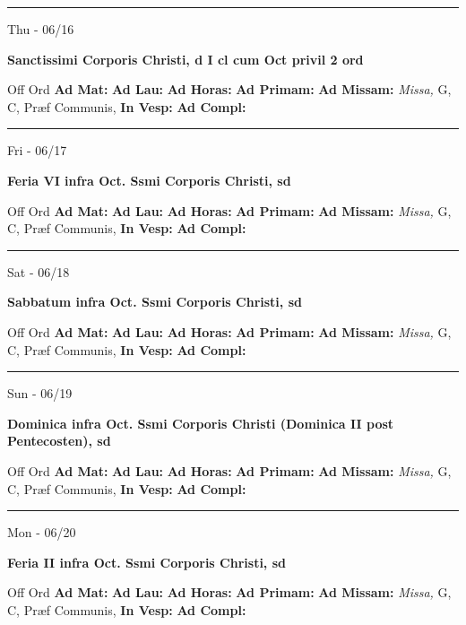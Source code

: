 \documentclass[letterpaper, 10pt]{article}
\begin{document}
\hrule
\begin{center}
Thu - 06/16
\end{center}\textbf{ \large Sanctissimi Corporis Christi, \textnormal{\normalsize d I cl cum Oct privil 2 ord}}
\begin{justify}
Off Ord
\textbf{Ad Mat: }
\textbf{Ad Lau: }
\textbf{Ad Horas: }
\textbf{Ad Primam: }
\textbf{Ad Missam:} \textit{Missa, } G, C, Præf Communis, 
\textbf{In Vesp: }
\textbf{Ad Compl: }\end{justify}



\hrule
\begin{center}
Fri - 06/17
\end{center}\textbf{ \large Feria VI infra Oct. Ssmi Corporis Christi, \textnormal{\normalsize sd}}
\begin{justify}
Off Ord
\textbf{Ad Mat: }
\textbf{Ad Lau: }
\textbf{Ad Horas: }
\textbf{Ad Primam: }
\textbf{Ad Missam:} \textit{Missa, } G, C, Præf Communis, 
\textbf{In Vesp: }
\textbf{Ad Compl: }\end{justify}



\hrule
\begin{center}
Sat - 06/18
\end{center}\textbf{ \large Sabbatum infra Oct. Ssmi Corporis Christi, \textnormal{\normalsize sd}}
\begin{justify}
Off Ord
\textbf{Ad Mat: }
\textbf{Ad Lau: }
\textbf{Ad Horas: }
\textbf{Ad Primam: }
\textbf{Ad Missam:} \textit{Missa, } G, C, Præf Communis, 
\textbf{In Vesp: }
\textbf{Ad Compl: }\end{justify}



\hrule
\begin{center}
Sun - 06/19
\end{center}\textbf{ \large Dominica infra Oct. Ssmi Corporis Christi (Dominica II post Pentecosten), \textnormal{\normalsize sd}}
\begin{justify}
Off Ord
\textbf{Ad Mat: }
\textbf{Ad Lau: }
\textbf{Ad Horas: }
\textbf{Ad Primam: }
\textbf{Ad Missam:} \textit{Missa, } G, C, Præf Communis, 
\textbf{In Vesp: }
\textbf{Ad Compl: }\end{justify}



\hrule
\begin{center}
Mon - 06/20
\end{center}\textbf{ \large Feria II infra Oct. Ssmi Corporis Christi, \textnormal{\normalsize sd}}
\begin{justify}
Off Ord
\textbf{Ad Mat: }
\textbf{Ad Lau: }
\textbf{Ad Horas: }
\textbf{Ad Primam: }
\textbf{Ad Missam:} \textit{Missa, } G, C, Præf Communis, 
\textbf{In Vesp: }
\textbf{Ad Compl: }\end{justify}
\end{document}
